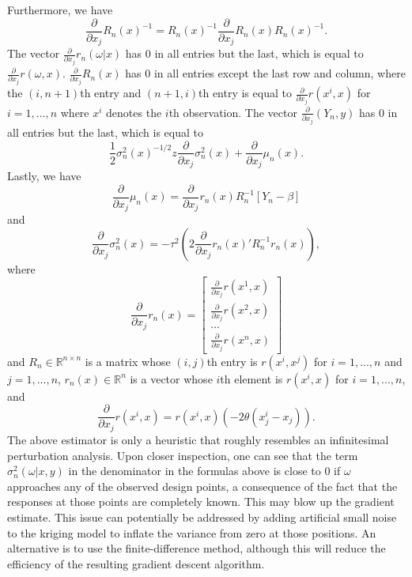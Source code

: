 \documentclass{wscpaperproc}
\theoremstyle{wsc}
\begin{document}
Furthermore, we have \begin{equation*}
\frac{\partial}{\partial x_j} R_{n}(x)^{-1}= R_{n}(x)^{-1} \frac{\partial}{\partial x_j} R_{n}(x) R_{n}(x)^{-1}.
\end{equation*}
The vector $\frac{\partial}{\partial x_j} r_n(\omega|x)$ has 0 in all entries but the last, which is equal to $\frac{\partial}{\partial x_j} r(\omega,x)$. $\frac{\partial}{\partial x_j} R_{n}(x)$ has 0 in all entries except the last row and column, where the $(i,n+1)$th entry and $(n+1,i)$th entry is equal to $\frac{\partial}{\partial x_j} r(x^i,x)$ for $i=1,...,n$ where $x^i$ denotes the $i$th observation. The vector $\frac{\partial}{\partial x_j}(Y_{n},y)$ has 0 in all entries but the last, which is equal to \begin{equation*}
\frac{1}{2}  \sigma^2_{n}(x) ^{-1/2} z \frac{\partial}{\partial x_j}\sigma^2_{n}(x)+\frac{\partial}{\partial x_j} \mu_{n}(x).
\end{equation*}
Lastly, we have \begin{equation*}
\frac{\partial}{\partial x_j} \mu_{n}(x)= \frac{\partial}{\partial x_j} r_{n} (x) R_{n}^{-1} [Y_{n}-\beta]
\end{equation*} and \begin{equation*}
\frac{\partial}{\partial x_j}\sigma^2_{n}(x)=-\tau^2 \left(2 \frac{\partial}{\partial x_j} r_{n}(x)'R_{n}^{-1} r_{n} (x) \right),
\end{equation*}
where \begin{equation*}
\frac{\partial}{\partial x_j} r_{n}(x)=\left[  {\begin{array}{c}
   \frac{\partial}{\partial x_j} r(x^1,x)  \\
   \frac{\partial}{\partial x_j} r(x^2,x) \\
   ...\\
   \frac{\partial}{\partial x_j} r(x^n,x)
  \end{array} }  \right]
\end{equation*}
and $R_n\in\mathbb R^{n\times n}$ is a matrix whose $(i,j)$th entry is $r(x^i,x^j)$ for $i=1,...,n$ and $j=1,...,n$, $r_n(x)\in\mathbb R^n$ is a vector whose $i$th element is $r(x^i,x)$ for $i=1,...,n$, and \begin{equation*}
\frac{\partial}{\partial x_j} r(x^i,x)=r(x^i,x)(-2 \theta(x^i_j-x_j)).
\end{equation*}
The above estimator is only a heuristic that roughly resembles an infinitesimal perturbation analysis. Upon closer inspection, one can see that the term $\sigma_n^2(\omega|x,y)$ in the denominator in the formulas above is close to 0 if $\omega$ approaches any of the observed design points, a consequence of the fact that the responses at those points are completely known. This may blow up the gradient estimate. This issue can potentially be addressed by adding artificial small noise to the kriging model to inflate the variance from zero at those positions. An alternative is to use the finite-difference method, although this will reduce the efficiency of the resulting gradient descent algorithm.
\end{document}
